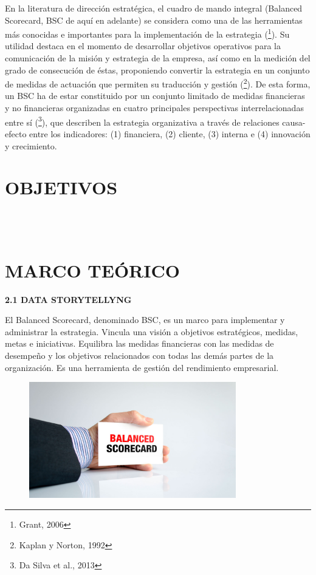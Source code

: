 \documentclass[a4paper,12pt,twocolumn]{article}
\begin{document}
\item{En la literatura de dirección estratégica, el cuadro de mando integral (Balanced Scorecard, BSC de aquí en adelante) se considera como una de las herramientas más conocidas e importantes para la implementación de la estrategia (\footnote{Grant, 2006}). Su utilidad destaca en el momento de desarrollar objetivos operativos para la comunicación de la misión y estrategia de la empresa, así como en la medición del grado de consecución de éstas, proponiendo convertir la estrategia en un conjunto de medidas de actuación que permiten su traducción y gestión (\footnote{Kaplan y Norton, 1992}). De esta forma, un BSC ha de estar constituido por un conjunto limitado de medidas financieras y no financieras organizadas en cuatro principales perspectivas interrelacionadas entre sí (\footnote{Da Silva et al., 2013}), que describen la estrategia organizativa a través de relaciones causa-efecto entre los indicadores: (1) financiera, (2) cliente, (3) interna e (4) innovación y crecimiento.}

\section{OBJETIVOS} 
\\
\textbf{}
\\

\section{MARCO TEÓRICO}
\textbf{2.1 DATA STORYTELLYNG}
\item{El Balanced Scorecard, denominado BSC, es un marco para implementar y administrar la estrategia. Vincula una visión a objetivos estratégicos, medidas, metas e iniciativas. Equilibra las medidas financieras con las medidas de desempeño y los objetivos relacionados con todas las demás partes de la organización. Es una herramienta de gestión del rendimiento empresarial.}

\begin{figure}[h!]
\centering
\includegraphics[width=9cm]{./Imagenes/img3}
\end{figure}
\end{document}
